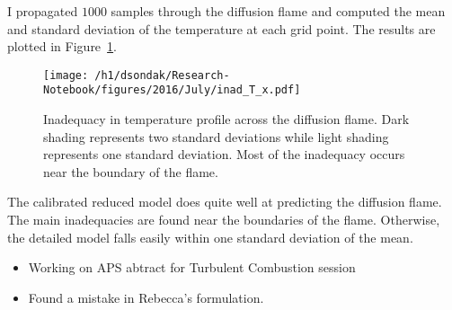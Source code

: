 I propagated $1000$ samples through the diffusion flame and computed the mean and standard deviation
of the temperature at each grid point.  The results are plotted in Figure~\ref{fig:inad_T_x}.
\begin{figure}[h!]
  \centering
  \texttt{[image: /h1/dsondak/Research-Notebook/figures/2016/July/inad\_T\_x.pdf]}
  \caption{Inadequacy in temperature profile across the diffusion flame.  Dark shading represents two
           standard deviations while light shading represents one standard deviation.  Most of the
           inadequacy occurs near the boundary of the flame.}
  \label{fig:inad_T_x}
\end{figure}
The calibrated reduced model does quite well at predicting the diffusion flame.  The main inadequacies 
are found near the boundaries of the flame.  Otherwise, the detailed model falls easily within one
standard deviation of the mean.



\begin{itemize}
  \item Working on APS abtract for Turbulent Combustion session
  \item Found a mistake in Rebecca's formulation.
\end{itemize}


